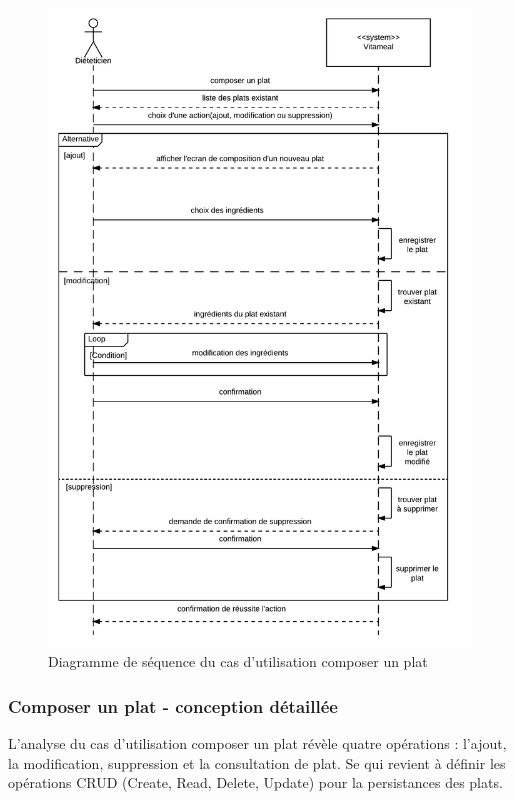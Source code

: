 \begin{figure}
\centering
\includegraphics[scale=0.3]{../../CasDUtilisations/CompositionPlat/sequence_UC_ComposerPlat.png}
\caption{Diagramme de séquence du cas d'utilisation composer un plat}
\label{ComposerPlatSeq}
\end{figure}

\subsubsection{Composer un plat - conception détaillée}

L'analyse du cas d'utilisation composer un plat révèle quatre opérations : l'ajout, la modification, suppression et la consultation de plat. Se qui revient à définir les opérations CRUD (Create, Read, Delete, Update) pour la persistances des plats.

